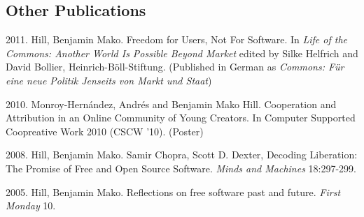 \documentclass[11pt]{article}
\newenvironment{cvlist}{
\begin{list}{}{\leftmargin=3.0em \itemindent=-3.0em}
  \setlength{\itemsep}{0pt}
  \setlength{\parskip}{0em}
  \setlength{\parsep}{1em}
  \setlength{\parindent}{0em}}
{\vspace{1em}
\end{list}}
\begin{document}


\subsection{Other Publications}
\begin{cvlist}
\item 2011. Hill, Benjamin Mako. Freedom for Users, Not For Software.
  In \emph{Life of the Commons: Another World Is Possible
  Beyond Market} edited by Silke Helfrich and David Bollier,
  Heinrich-Böll-Stiftung. (Published in German as
  \emph{Commons: Für eine neue Politik Jenseits von Markt und Staat})
\item 2010. Monroy-Hernández, Andrés and Benjamin Mako
  Hill. Cooperation and Attribution in an Online Community of
  Young Creators. In Computer Supported Coopreative Work 2010
  (CSCW '10). (Poster)
\item 2008. Hill, Benjamin Mako. Samir Chopra, Scott
  D. Dexter, Decoding Liberation: The Promise of Free and Open Source
  Software. \emph{Minds and Machines} 18:297-299.
\item 2005. Hill, Benjamin Mako. Reflections on free
  software past and future. \emph{First Monday} 10.

\end{cvlist}
\end{document}
